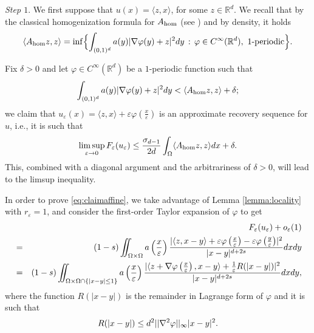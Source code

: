 \documentclass[11pt,a4paper,reqno]{amsart}
\theoremstyle{plain}
\theoremstyle{definition}
\newcommand\e{\varepsilon}
\newcommand\Rd{\mathbb{R}^d}
\newcommand\Om{\Omega}
\newcommand\be{\begin{equation}}
\newcommand\ee{\end{equation}}
\theoremstyle{remark}
\begin{document}
\smallskip

\textit{Step $1$}. We first suppose that $u(x)=\langle z,x\rangle$, for some $z\in\mathbb{R}^d$. We recall that by the classical homogenization formula for $A_{\rm hom}$ (see \cite[Theorem 14.7]{BDF}) and by density, it holds
\be\label{eq:defphi}
\langle A_{\rm hom}z, z\rangle =\inf\Bigl\{\int_{(0,1)^d}a(y)\lvert\nabla{\varphi}(y)+z\rvert^2dy\,:\,\varphi\in C^\infty(\Rd),\,\,1\text{-periodic}\Bigr\}.
\ee

\noindent Fix $\delta>0$ and let $\varphi\in C^\infty(\Rd)$ be a $1$-periodic function such that
\be\label{eq:phidelta}
\int_{(0,1)^d}a(y)\lvert\nabla\varphi(y)+z\rvert^2 dy < \langle A_{\rm hom}z,z\rangle + \delta;
\ee
we claim that $u_\e(x)=\langle z,x\rangle+\e\varphi\left(\frac{x}{\e}\right)$ is an approximate recovery sequence for $u$, i.e., it is such that
\be\label{eq:claimaffine}
\limsup_{\e\to0} F_\e(u_\e) \leq\frac{\sigma_{d-1}}{2d}\int_\Omega\langle A_{\rm hom}z,z\rangle dx+\delta.
\ee
This, combined with a diagonal argument and the arbitrariness of $\delta>0$, will lead to the limsup inequality.

In order to prove \eqref{eq:claimaffine}, we take advantage of Lemma \ref{lemma:locality} with $r_\e=1$, and consider the first-order Taylor expansion of $\varphi$ to get
\begin{eqnarray*} \label{eq:Feueaffred} \nonumber
&&\hskip-1cm F_\e(u_\e) +o_\e(1)\\ \nonumber
&=& (1-s)\iint_{\Om\times\Om} a\left(\frac{x}{\e}\right)\frac{\lvert \langle z,x-y\rangle+\e\varphi\left(\frac{x}{\e}\right)-\e\varphi\left(\frac{y}{\e}\right)\rvert^2}{\lvert x-y\rvert^{d+2s}}dxdy \\
&=& (1-s)\iint_{\Om\times\Om\cap\{\lvert x-y\rvert\leq 1\}}a\left(\frac{x}{\e}\right)\frac{|\langle z + \nabla{\varphi}\left(\frac{x}{\e}\right),x-y\rangle+\frac{1}{\e}R(|x-y|)\rvert^2}{\lvert x-y\rvert^{d+2s}}dxdy,
\end{eqnarray*} 
where the function $R(|x-y|)$ is the remainder in Lagrange form of $\varphi$ and it is such that
\be \label{eq:taylorphi}
R(|x-y|)\leq d^2||\nabla^2\varphi||_{\rm \infty}|x-y|^2.
\ee
\end{document}

